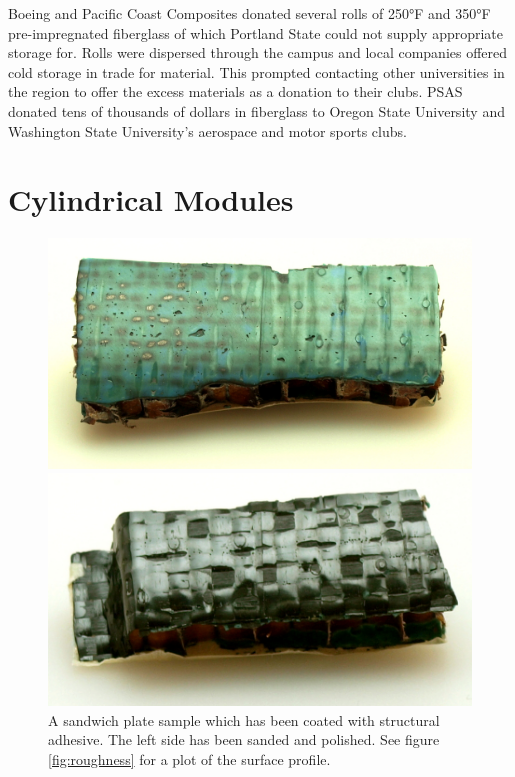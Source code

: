 \documentclass{aiaa-tc}%
\begin{document}
Boeing and Pacific Coast Composites donated several rolls of 250°F and 350°F pre-impregnated fiberglass of which Portland State could not supply appropriate storage for. Rolls were dispersed through the campus and local companies offered cold storage in trade for material. This prompted contacting other universities in the region to offer the excess materials as a donation to their clubs. PSAS donated tens of thousands of dollars in fiberglass to Oregon State University and Washington State University's aerospace and motor sports clubs. 

\section{Cylindrical Modules}\label{sec:modules}

\begin{figure}[t]
	\centering
	\parbox{0.45\linewidth}
	{
		\centering
		\includegraphics[width=\linewidth]{../img/coated.JPG}	
		\caption{A sandwich plate sample which has been coated with structural adhesive. The left side has been sanded and polished. See figure \ref{fig:roughness} for a plot of the surface profile.}
		\label{fig:coated}
	}
	\hfill
	\parbox{0.45\linewidth}
	{
		\centering
		\includegraphics[width=\linewidth]{../img/uncoated.JPG}	
}
\end{figure}
\end{document}
